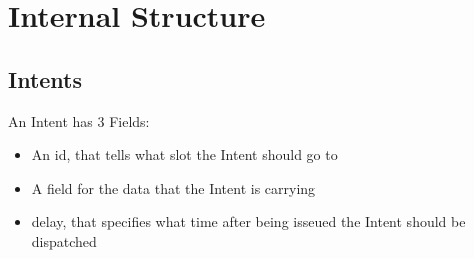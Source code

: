 \documentclass[12pt,a4paper]{article}
\begin{document}
\section{Internal Structure}
\subsection{Intents}
An Intent has 3 Fields:
\begin{itemize}
    \item An id, that tells what slot the Intent should go to
    \item A field for the data that the Intent is carrying
    \item delay, that specifies what time after being isseued the Intent should
          be dispatched
\end{itemize} 
\end{document}
